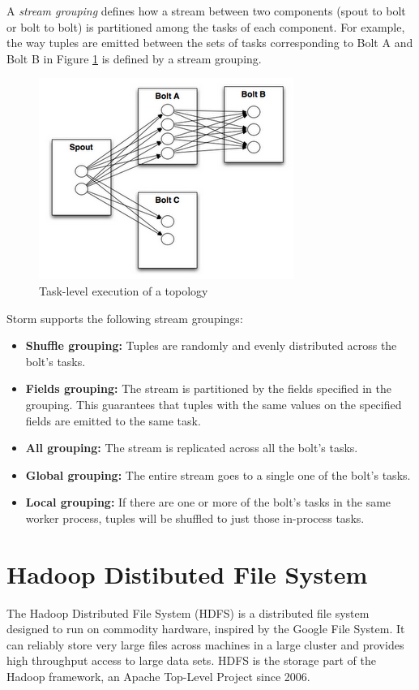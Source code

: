 A \emph{stream grouping} defines how a stream between two components (spout to bolt or bolt to bolt) is partitioned among the tasks of each component. For example, the way tuples are emitted between the sets of tasks corresponding to Bolt A and Bolt B in Figure \ref{figure:storm_groupings} is defined by a stream grouping.

\begin{figure}[H]
\centering
\includegraphics{figures/storm_groupings}
\caption{Task-level execution of a topology}
\label{figure:storm_groupings}
\end{figure}

Storm supports the following stream groupings:
\begin{itemize}
\item \textbf{Shuffle grouping:} Tuples are randomly and evenly distributed across the bolt's tasks.
\item \textbf{Fields grouping:} The stream is partitioned by the fields specified in the grouping. This guarantees that tuples with the same values on the specified fields are emitted to the same task.
\item \textbf{All grouping:} The stream is replicated across all the bolt's tasks.
\item \textbf{Global grouping:} The entire stream goes to a single one of the bolt's tasks.
\item \textbf{Local grouping:} If there are one or more of the bolt's tasks in the same worker process, tuples will be shuffled to just those in-process tasks.
\end{itemize}

\section{Hadoop Distibuted File System}

The Hadoop Distributed File System (HDFS) is a distributed file system designed to run on commodity hardware, inspired by the Google File System. It can reliably store very large files across machines in a large cluster and provides high throughput access to large data sets. HDFS is the storage part of the Hadoop framework, an Apache Top-Level Project since 2006.


